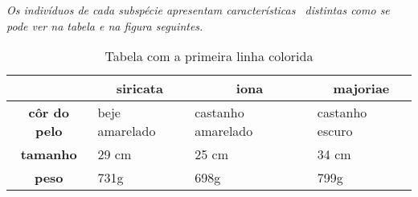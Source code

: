 \documentclass[a4paper,11pt]{report}
\begin{document}
	\textit{Os indivíduos de cada subspécie apresentam características \
	distintas como se pode ver na tabela e na figura seguintes.}

	\begin{table}[h!]
		\begin{tabular}{|c|l|l|l|}
			\hline 
			\rowcolor{gray!40}
			\multicolumn{1}{|l|}{} &
			\multicolumn{1}{c|}{\textbf{siricata}} &
			\multicolumn{1}{c|}{\textbf{iona}} &
			\multicolumn{1}{c|}{\textbf{majoriae}} \\ \hline
			\textbf{côr do pelo} & beje amarelado & castanho amarelado & castanho escuro \\ \hline
			\textbf{tamanho}     & 29 cm          & 25 cm              & 34 cm           \\ \hline
			\textbf{peso}        & 731g           & 698g               & 799g            \\ \hline
		\end{tabular}
		\caption{Tabela com a primeira linha colorida}
	\end{table}
\end{document}
